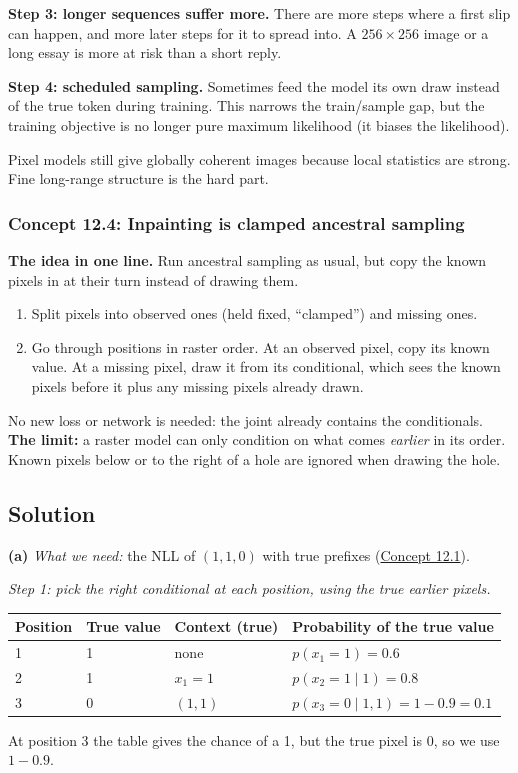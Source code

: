 \documentclass[12pt,a4paper]{article}
\begin{document}
\textbf{Step 3: longer sequences suffer more.} There are more steps where a first slip can happen, and more later steps for it to spread into. A $256\times256$ image or a long essay is more at risk than a short reply.

\textbf{Step 4: scheduled sampling.} Sometimes feed the model its own draw instead of the true token during training. This narrows the train/sample gap, but the training objective is no longer pure maximum likelihood (it biases the likelihood).

Pixel models still give globally coherent images because local statistics are strong. Fine long-range structure is the hard part.

\subsubsection{Concept 12.4: Inpainting is clamped ancestral sampling}\label{c12-4}

\textbf{The idea in one line.} Run ancestral sampling as usual, but copy the known pixels in at their turn instead of drawing them.

\begin{enumerate}[nosep]
  \item Split pixels into observed ones (held fixed, ``clamped'') and missing ones.
  \item Go through positions in raster order. At an observed pixel, copy its known value. At a missing pixel, draw it from its conditional, which sees the known pixels before it plus any missing pixels already drawn.
\end{enumerate}
No new loss or network is needed: the joint already contains the conditionals. \textbf{The limit:} a raster model can only condition on what comes \emph{earlier} in its order. Known pixels below or to the right of a hole are ignored when drawing the hole.

\subsection{Solution}

\textbf{(a)} \emph{What we need:} the NLL of $(1,1,0)$ with true prefixes (\hyperref[c12-1]{Concept 12.1}).

\emph{Step 1: pick the right conditional at each position, using the true earlier pixels.}
\begin{center}
\begin{tabular}{@{}llll@{}}
\toprule
Position & True value & Context (true) & Probability of the true value \\
\midrule
1 & 1 & none & $p(x_1=1)=0.6$ \\
2 & 1 & $x_1=1$ & $p(x_2=1\mid1)=0.8$ \\
3 & 0 & $(1,1)$ & $p(x_3=0\mid1,1)=1-0.9=0.1$ \\
\bottomrule
\end{tabular}
\end{center}
At position 3 the table gives the chance of a 1, but the true pixel is 0, so we use $1-0.9$.
\end{document}
